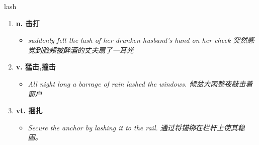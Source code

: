 
\begin{frame}
{\huge lash}
\begin{center}
\begin{enumerate}\Large
  \item \textbf{n. 击打}
  \begin{itemize}
    \item \em{\Large{suddenly felt the lash of her drunken husband's hand on her cheek 突然感觉到脸颊被醉酒的丈夫扇了一耳光}}
  \end{itemize}
  \item \textbf{v. 猛击,撞击}
  \begin{itemize}
    \item \em{\Large{All night long a barrage of rain lashed the windows. 倾盆大雨整夜敲击着窗户}}
  \end{itemize}
  \item \textbf{vt. 捆扎}
  \begin{itemize}
    \item \em{\Large{Secure the anchor by lashing it to the rail. 通过将锚绑在栏杆上使其稳固。}}
  \end{itemize}
\end{enumerate}
\end{center}
\end{frame}
